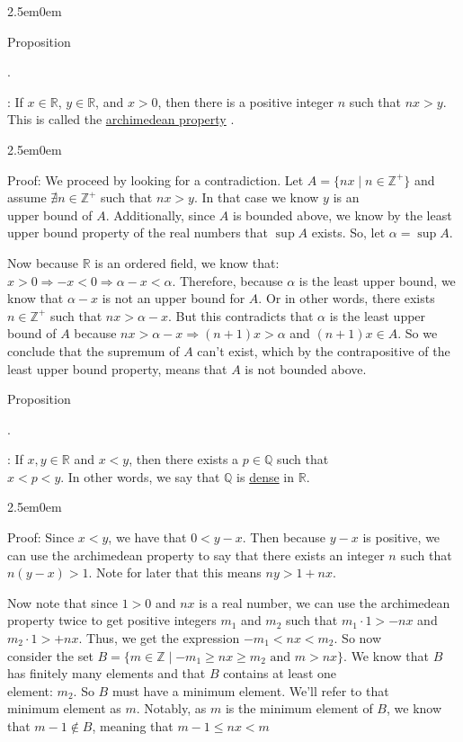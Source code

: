 \documentclass{book}
\newcommand{\hTwo}{%
   \color{MidnightBlue}%
   \fontsize{13}{15}\selectfont%
}
\newcommand{\hThree}{%
   \color{PineGreen}
   \fontsize{13}{15}\selectfont%
}
\newenvironment{myIndent}{%
   \begin{adjustwidth}{2.5em}{0em}%
}{%
   \end{adjustwidth}%
}
\newcommand{\udefine}[1]{%
   \setulcolor{Red}%
   \setul{0.14em}{0.07em}%
   \ul{#1}%
}
\newcommand{\retTwo}{\hfill\bigbreak}
\newcounter{PropNumber}
\newcommand{\propCount}[1][1]{%
   \addtocounter{PropNumber}{#1}%
   \thePropNumber%
}
\newcounter{SubPropNumber}
\newcommand{\subPropCount}[1][1]{%
   \addtocounter{SubPropNumber}{1}%
   \theSubPropNumber%
}
\newcommand{\resetSubPropCount}{%
   \setcounter{SubPropNumber}{0}%
}
\begin{document}
   
   {\begin{myIndent} \hTwo \resetSubPropCount
      Proposition \propCount.\subPropCount: If $x\in\mathbb{R}$, $y\in\mathbb{R}$, and $x>0$, then there is a positive integer $n$ such that $nx>y$. This is called the \udefine{archimedean property}.

      {\begin{myIndent} \hThree
         Proof: We proceed by looking for a contradiction. Let $A=\{nx \mid n\in\mathbb{Z}^+\}$ and assume $\nexists n\in\mathbb{Z}^+$ such that $nx>y$. In that case we know $y$ is an \\upper bound of $A$. Additionally, since $A$ is bounded above, we know by the least upper bound property of the real numbers that $\sup{A}$ exists. So, let $\alpha=\sup{A}$. \retTwo

         Now because $\mathbb{R}$ is an ordered field, we know that: \\
         $x>0 \Rightarrow -x<0 \Rightarrow \alpha-x<\alpha$. Therefore, because $\alpha$ is the least upper bound, we know that $\alpha - x$ is not an upper bound for $A$. Or in other words, there exists $n\in\mathbb{Z}^+$ such that $nx>\alpha-x$. But this contradicts that $\alpha$ is the least upper bound of $A$ because $nx>\alpha-x \Rightarrow (n+1)x>\alpha$ and $(n+1)x\in A$. So we conclude that the supremum of $A$ can't exist, which by the contrapositive of the least upper bound property, means that $A$ is not bounded above.
         \retTwo
      \end{myIndent}}

      Proposition \propCount[0].\subPropCount: If $x, y\in\mathbb{R}$ and $x<y$, then there exists a $p\in\mathbb{Q}$ such that\\ $x<p<y$. In other words, we say that $\mathbb{Q}$ is \udefine{dense} in $\mathbb{R}$.

      {\begin{myIndent} \hThree
         Proof: Since $x<y$, we have that $0<y-x$. Then because $y-x$ is positive, we can use the archimedean property to say that there exists an integer $n$ such that $n(y-x)>1$. Note for later that this means $ny>1+nx$.

         \newpage

         Now note that since $1>0$ and $nx$ is a real number, we can use the archimedean property twice to get positive integers $m_1$ and $m_2$ such that $m_1\cdot1>-nx$ and $m_2\cdot1>+nx$. Thus, we get the expression $-m_1 < nx < m_2$. So now \\consider the set $B = \{m \in \mathbb{Z} \mid -m_1 \geq nx \geq m_2 \text{ and } m>nx\}$. We know that $B$ has finitely many elements and that $B$ contains at least one \\element: $m_2$. So $B$ must have a minimum element. We'll refer to that \\minimum element as $m$. Notably, as $m$ is the minimum element of $B$, we know that $m-1 \notin B$, meaning that $m-1\leq nx < m$ \retTwo


\end{myIndent}}
\end{myIndent}}
\end{document}
